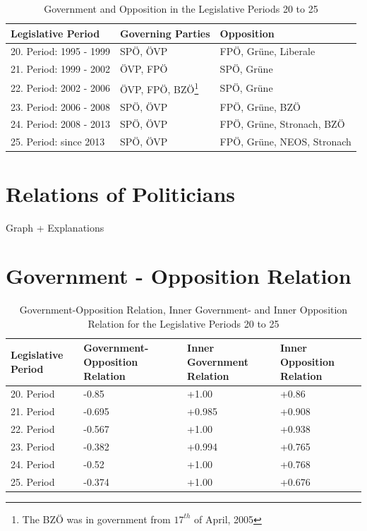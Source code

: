 \begin{table}[h]

\centering
\bgroup
\def\arraystretch{1.2}
\begin{tabular}{| p{4cm} | p{3cm} | l |}
\hline
  Legislative Period & Governing Parties & Opposition  \\
\hline
\hline
  20. Period: 1995 - 1999 & SPÖ, ÖVP & FPÖ, Grüne, Liberale \\
\hline
  21. Period: 1999 - 2002 & ÖVP, FPÖ & SPÖ, Grüne \\
\hline
  22. Period: 2002 - 2006 & ÖVP, FPÖ, BZÖ\footnote{The BZÖ was in government from $17^{th}$ of April, 2005} & SPÖ, Grüne \\
\hline
  23. Period: 2006 - 2008 & SPÖ, ÖVP & FPÖ, Grüne, BZÖ \\
\hline
  24. Period: 2008 - 2013 & SPÖ, ÖVP & FPÖ, Grüne, Stronach, BZÖ \\
\hline
  25. Period: since 2013 & SPÖ, ÖVP & FPÖ, Grüne, NEOS, Stronach \\
\hline

\end{tabular}
\egroup
\caption{Government and Opposition in the Legislative Periods 20 to 25}
\label{table:gov_opp_parties}
\end{table}


\section{Relations of Politicians}
Graph + Explanations

\section{Government - Opposition Relation}
\label{sec:gov_opp_relation}


\begin{table}[h]

\centering
\bgroup
\def\arraystretch{1.2}
\begin{tabular}{| p{2cm} | p{3cm} | p{3cm} | p{3cm} |}
\hline
  Legislative Period & Government-Opposition Relation & Inner Government Relation & Inner Opposition Relation \\
\hline
\hline
  20. Period & -0.85 & +1.00 & +0.86 \\
\hline
  21. Period & -0.695 & +0.985 & +0.908 \\
\hline
  22. Period & -0.567 & +1.00 & +0.938 \\
\hline
  23. Period & -0.382 & +0.994 & +0.765\\
\hline
  24. Period & -0.52 & +1.00 & +0.768\\
\hline
  25. Period & -0.374 & +1.00 & +0.676\\
\hline

\end{tabular}
\egroup
\caption{Government-Opposition Relation, Inner Government- and Inner Opposition Relation for the Legislative Periods 20 to 25}
\label{table:gov_opp_relation}
\end{table}